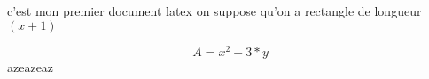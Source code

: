\documentclass[12pt]{article}
\begin{document}
c'est mon premier document latex
on suppose qu'on a rectangle de longueur $(x+1)$

$$A=x^2+3*y$$ azeazeaz
\end{document}
